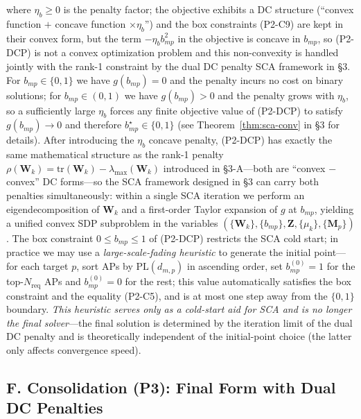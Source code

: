 \documentclass[12pt,a4paper]{article}
\newcommand{\mat}[1]{\mathbf{#1}}
\newcommand{\tr}{\text{tr}}
\begin{document}
where $\eta_b \geq 0$ is the penalty factor; the objective exhibits a DC structure (``convex function $+$ concave function $\times \eta_b$'') and the box constraints (P2-C9) are kept in their convex form, but the term $-\eta_b b_{mp}^2$ in the objective is concave in $b_{mp}$, so (P2-DCP) is not a convex optimization problem and this non-convexity is handled jointly with the rank-1 constraint by the dual DC penalty SCA framework in \S3. For $b_{mp} \in \{0,1\}$ we have $g(b_{mp}) = 0$ and the penalty incurs no cost on binary solutions; for $b_{mp} \in (0,1)$ we have $g(b_{mp}) > 0$ and the penalty grows with $\eta_b$, so a sufficiently large $\eta_b$ forces any finite objective value of (P2-DCP) to satisfy $g(b_{mp}) \to 0$ and therefore $b_{mp}^\star \in \{0,1\}$ (see Theorem~\ref{thm:sca-conv} in \S3 for details). After introducing the $\eta_b$ concave penalty, (P2-DCP) has exactly the same mathematical structure as the rank-1 penalty $\rho(\mat{W}_k) = \tr(\mat{W}_k) - \lambda_{\max}(\mat{W}_k)$ introduced in \S3-A---both are ``convex $-$ convex'' DC forms---so the SCA framework designed in \S3 can carry both penalties simultaneously: within a single SCA iteration we perform an eigendecomposition of $\mat{W}_k$ and a first-order Taylor expansion of $g$ at $b_{mp}$, yielding a unified convex SDP subproblem in the variables $(\{\mat{W}_k\}, \{b_{mp}\}, \mat{Z}, \{\mu_k\}, \{\mat{M}_p\})$. The box constraint $0 \leq b_{mp} \leq 1$ of (P2-DCP) restricts the SCA cold start; in practice we may use a \emph{large-scale-fading heuristic} to generate the initial point---for each target $p$, sort APs by $\text{PL}(d_{m,p})$ in ascending order, set $b_{mp}^{(0)} = 1$ for the top-$N_{\text{req}}$ APs and $b_{mp}^{(0)} = 0$ for the rest; this value automatically satisfies the box constraint and the equality (P2-C5), and is at most one step away from the $\{0,1\}$ boundary. \emph{This heuristic serves only as a cold-start aid for SCA and is no longer the final solver}---the final solution is determined by the iteration limit of the dual DC penalty and is theoretically independent of the initial-point choice (the latter only affects convergence speed).

\subsection*{F. Consolidation (P3): Final Form with Dual DC Penalties}
\end{document}
